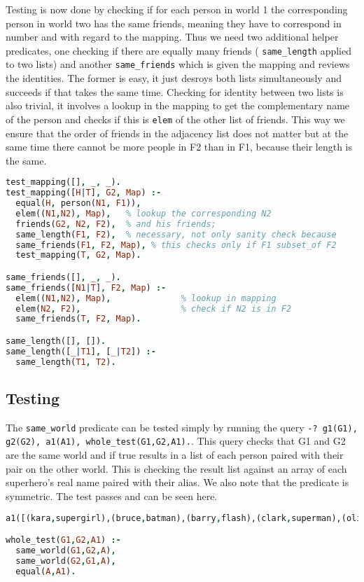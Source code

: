 \documentclass{article}
\begin{document}
Testing is now done by checking if for each person in world 1 the corresponding
person in world two has the same friends, meaning they have to correspond in number
and with regard to the mapping. Thus we need two additional helper predicates,
one checking if there are equally many friends ( \texttt{same\_length} applied to
two lists) and another \texttt{same\_friends} which is given the mapping and
reviews the identities. The former is easy, it just desroys both lists simultaneously
and succeeds if that takes the same time. Checking for identity between two lists
is also trivial, it involves a lookup in the mapping to get the complementary name
of the person and checks if this is \texttt{elem} of the other list of friends.
This way we ensure that the order of friends in the adjacency list does not matter
but at the same time there cannot be more people in F2 than in F1, because their
length is the same.

\begin{lstlisting}[language=Prolog]
test_mapping([], _, _).
test_mapping([H|T], G2, Map) :-
  equal(H, person(N1, F1)),
  elem((N1,N2), Map),   % lookup the corresponding N2
  friends(G2, N2, F2),  % and his friends;
  same_length(F1, F2),  % necessary, not only sanity check because
  same_friends(F1, F2, Map), % this checks only if F1 subset_of F2
  test_mapping(T, G2, Map).

same_friends([], _, _).
same_friends([N1|T], F2, Map) :-
  elem((N1,N2), Map),              % lookup in mapping
  elem(N2, F2),                    % check if N2 is in F2
  same_friends(T, F2, Map).

same_length([], []).
same_length([_|T1], [_|T2]) :-
  same_length(T1, T2).
\end{lstlisting}


\subsection{Testing}
The \texttt{same\_world} predicate can be tested simply by running the query \texttt{-? g1(G1), g2(G2), a1(A1), whole\_test(G1,G2,A1).}. This query checks that G1 and G2 are the same world and if true results in a list of each person paired with their pair on the other world. This is checking the result list against an array of each superhero's real name paired with their alias.
We also note that the predicate is symmetric.
The test passes and can be seen here.
\begin{lstlisting}[language=Prolog]
a1([(kara,supergirl),(bruce,batman),(barry,flash),(clark,superman),(oliver,green_arrow)]).

whole_test(G1,G2,A1) :-
  same_world(G1,G2,A),
  same_world(G2,G1,A),
  equal(A,A1).
\end{lstlisting}
\end{document}

